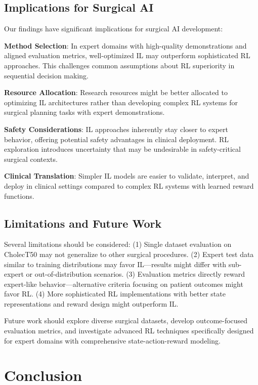 \documentclass[runningheads]{llncs}
\begin{document}
\subsection{Implications for Surgical AI}

Our findings have significant implications for surgical AI development:

\textbf{Method Selection}: In expert domains with high-quality demonstrations and aligned evaluation metrics, well-optimized IL may outperform sophisticated RL approaches. This challenges common assumptions about RL superiority in sequential decision making.

\textbf{Resource Allocation}: Research resources might be better allocated to optimizing IL architectures rather than developing complex RL systems for surgical planning tasks with expert demonstrations.

\textbf{Safety Considerations}: IL approaches inherently stay closer to expert behavior, offering potential safety advantages in clinical deployment. RL exploration introduces uncertainty that may be undesirable in safety-critical surgical contexts.

\textbf{Clinical Translation}: Simpler IL models are easier to validate, interpret, and deploy in clinical settings compared to complex RL systems with learned reward functions.

\subsection{Limitations and Future Work}

Several limitations should be considered: (1) Single dataset evaluation on CholecT50 may not generalize to other surgical procedures. (2) Expert test data similar to training distributions may favor IL—results might differ with sub-expert or out-of-distribution scenarios. (3) Evaluation metrics directly reward expert-like behavior—alternative criteria focusing on patient outcomes might favor RL. (4) More sophisticated RL implementations with better state representations and reward design might outperform IL.

Future work should explore diverse surgical datasets, develop outcome-focused evaluation metrics, and investigate advanced RL techniques specifically designed for expert domains with comprehensive state-action-reward modeling.

\section{Conclusion}
\end{document}
